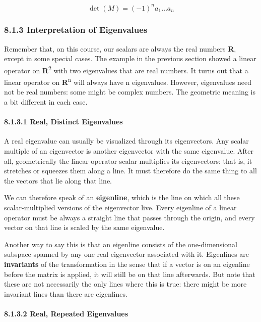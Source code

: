 \documentclass[oneside,english]{amsbook}
\numberwithin{section}{chapter}
\theoremstyle{plain}
\theoremstyle{definition}
\begin{document}
\[\det(M) = ( - 1)^{n}a_{1}\ldots a_{n}\]

\subsubsection{8.1.3 Interpretation of
	Eigenvalues}\label{interpretation-of-eigenvalues}

Remember that, on this course, our scalars are always the real numbers
\textbf{R}, except in some special cases. The example in the previous
section showed a linear operator on \textbf{R}\textsuperscript{2} with
two eigenvalues that are real numbers. It turns out that a linear
operator on \textbf{R}\textsuperscript{n} will always have n
eigenvalues. However, eigenvalues need not be real numbers: some might
be complex numbers. The geometric meaning is a bit different in each
case.

\paragraph{8.1.3.1 Real, Distinct
	Eigenvalues}\label{real-distinct-eigenvalues}

A real eigenvalue can usually be visualized through its eigenvectors.
Any scalar multiple of an eigenvector is another eigenvector with the
same eigenvalue. After all, geometrically the linear operator scalar
multiplies its eigenvectors: that is, it stretches or squeezes them
along a line. It must therefore do the same thing to all the vectors
that lie along that line.

We can therefore speak of an \textbf{eigenline}, which is the line on
which all these scalar-multiplied versions of the eigenvector live.
Every eigenline of a linear operator must be always a straight line that
passes through the origin, and every vector on that line is scaled by
the same eigenvalue.

Another way to say this is that an eigenline consists of the
one-dimensional subspace spanned by any one real eigenvector associated
with it. Eigenlines are \textbf{invariants} of the transformation in the
sense that if a vector is on an eigenline before the matrix is applied,
it will still be on that line afterwards. But note that these are not
necessarily the only lines where this is true: there might be more
invariant lines than there are eigenlines.

\paragraph{8.1.3.2 Real, Repeated
	Eigenvalues}\label{real-repeated-eigenvalues}
\end{document}
